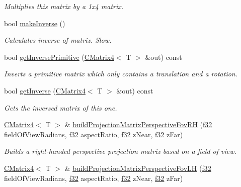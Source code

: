 \begin{DoxyCompactItemize}
\begin{DoxyCompactList}\small\item\em Multiplies this matrix by a 1x4 matrix. \end{DoxyCompactList}\item 
bool \hyperlink{classirr_1_1core_1_1CMatrix4_a3fbface2cb6b959af64f82a5bb17540e}{make\+Inverse} ()
\begin{DoxyCompactList}\small\item\em Calculates inverse of matrix. Slow. \end{DoxyCompactList}\item 
bool \hyperlink{classirr_1_1core_1_1CMatrix4_af8c024c494998296fc7ed63603d7cb62}{get\+Inverse\+Primitive} (\hyperlink{classirr_1_1core_1_1CMatrix4}{C\+Matrix4}$<$ T $>$ \&out) const 
\begin{DoxyCompactList}\small\item\em Inverts a primitive matrix which only contains a translation and a rotation. \end{DoxyCompactList}\item 
bool \hyperlink{classirr_1_1core_1_1CMatrix4_a33c110cd75fdddb840a990ab52f10900}{get\+Inverse} (\hyperlink{classirr_1_1core_1_1CMatrix4}{C\+Matrix4}$<$ T $>$ \&out) const 
\begin{DoxyCompactList}\small\item\em Gets the inversed matrix of this one. \end{DoxyCompactList}\item 
\hyperlink{classirr_1_1core_1_1CMatrix4}{C\+Matrix4}$<$ T $>$ \& \hyperlink{classirr_1_1core_1_1CMatrix4_a5bea6c6f5479720841cea61651e35879}{build\+Projection\+Matrix\+Perspective\+Fov\+RH} (\hyperlink{namespaceirr_a0277be98d67dc26ff93b1a6a1d086b07}{f32} field\+Of\+View\+Radians, \hyperlink{namespaceirr_a0277be98d67dc26ff93b1a6a1d086b07}{f32} aspect\+Ratio, \hyperlink{namespaceirr_a0277be98d67dc26ff93b1a6a1d086b07}{f32} z\+Near, \hyperlink{namespaceirr_a0277be98d67dc26ff93b1a6a1d086b07}{f32} z\+Far)\hypertarget{classirr_1_1core_1_1CMatrix4_a5bea6c6f5479720841cea61651e35879}{}\label{classirr_1_1core_1_1CMatrix4_a5bea6c6f5479720841cea61651e35879}

\begin{DoxyCompactList}\small\item\em Builds a right-\/handed perspective projection matrix based on a field of view. \end{DoxyCompactList}\item 
\hyperlink{classirr_1_1core_1_1CMatrix4}{C\+Matrix4}$<$ T $>$ \& \hyperlink{classirr_1_1core_1_1CMatrix4_a1895b967a8f8c9d7ad90fe5434f2499f}{build\+Projection\+Matrix\+Perspective\+Fov\+LH} (\hyperlink{namespaceirr_a0277be98d67dc26ff93b1a6a1d086b07}{f32} field\+Of\+View\+Radians, \hyperlink{namespaceirr_a0277be98d67dc26ff93b1a6a1d086b07}{f32} aspect\+Ratio, \hyperlink{namespaceirr_a0277be98d67dc26ff93b1a6a1d086b07}{f32} z\+Near, \hyperlink{namespaceirr_a0277be98d67dc26ff93b1a6a1d086b07}{f32} z\+Far)\hypertarget{classirr_1_1core_1_1CMatrix4_a1895b967a8f8c9d7ad90fe5434f2499f}{}\label{classirr_1_1core_1_1CMatrix4_a1895b967a8f8c9d7ad90fe5434f2499f}


\end{DoxyCompactItemize}

